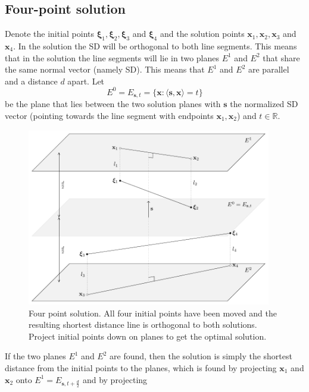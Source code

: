 \subsection{Four-point solution}
%
Denote the initial points $\boldsymbol{\xi}_1, \boldsymbol{\xi}_2, \boldsymbol{\xi}_3$ 
and $\boldsymbol{\xi}_4$ and the solution points $\textbf{x}_1, \textbf{x}_2, \textbf{x}_3$ 
and $\textbf{x}_4$. In the solution the SD will be orthogonal to both line segments. 
This means that in the solution the line segments will lie in two planes $E^1$ and $E^2$
that share the same normal vector (namely SD). This means that $E^1$ and $E^2$ are parallel 
and a distance $d$ apart. 
Let
%
\begin{equation}
E^0 = E_{\textbf{s},t} = \{ \textbf{x} : \langle \textbf{s},\textbf{x} \rangle = t \}
\end{equation} 
be the plane that lies between the two solution planes with $\textbf{s}$ the
normalized SD vector (pointing towards the line segment with endpoints $\textbf{x}_1, \textbf{x}_2$)
and $t \in \mathbb{R}$.
%
\begin{figure}[H]
	\centering
	\includegraphics[width=0.95\textwidth]{figures/constraint_handling/four_point_interwell_problem.pdf}
	\caption{Four point solution. All four initial points have been moved and the resulting shortest distance
			 line is orthogonal to both solutions. Project initial points down on planes to get the optimal
			 solution.}
	\label{fig:four_point_problem}
\end{figure}
%
If the two planes $E^1$ and $E^2$ are found, then the solution is simply
the shortest distance from the initial points to the planes, which is found by projecting 
$\textbf{x}_1$ and $\textbf{x}_2$ onto $E^1 = E_{\textbf{s},t+\frac{d}{2}}$ and by projecting
